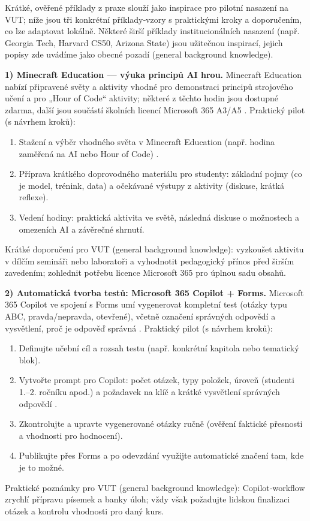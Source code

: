 Krátké, ověřené příklady z praxe slouží jako inspirace pro pilotní nasazení na VUT; níže jsou tři konkrétní příklady‑vzory s praktickými kroky a doporučením, co lze adaptovat lokálně. Některé širší příklady institucionálních nasazení (např. Georgia Tech, Harvard CS50, Arizona State) jsou užitečnou inspirací, jejich popisy zde uvádíme jako obecné pozadí (general background knowledge).

\medskip

\textbf{1) Minecraft Education — výuka principů AI hrou.}  
Minecraft Education nabízí připravené světy a aktivity vhodné pro demonstraci principů strojového učení a pro „Hour of Code“ aktivity; některé z těchto hodin jsou dostupné zdarma, další jsou součástí školních licencí Microsoft 365 A3/A5 \cite{kb_ai_101_tipu_pdf_04e4a115_page_15_2}.  
Praktický pilot (s návrhem kroků):
\begin{enumerate}
  \item Stažení a výběr vhodného světa v Minecraft Education (např. hodina zaměřená na AI nebo Hour of Code) \cite{kb_ai_101_tipu_pdf_04e4a115_page_15_2}.
  \item Příprava krátkého doprovodného materiálu pro studenty: základní pojmy (co je model, trénink, data) a očekávané výstupy z aktivity (diskuse, krátká reflexe).
  \item Vedení hodiny: praktická aktivita ve světě, následná diskuse o možnostech a omezeních AI a závěrečné shrnutí.
\end{enumerate}
Krátké doporučení pro VUT (general background knowledge): vyzkoušet aktivitu v dílčím semináři nebo laboratoři a vyhodnotit pedagogický přínos před širším zavedením; zohlednit potřebu licence Microsoft 365 pro úplnou sadu obsahů.

\medskip

\textbf{2) Automatická tvorba testů: Microsoft 365 Copilot + Forms.}  
Microsoft 365 Copilot ve spojení s Forms umí vygenerovat kompletní test (otázky typu ABC, pravda/nepravda, otevřené), včetně označení správných odpovědí a vysvětlení, proč je odpověď správná \cite{kb_ai_101_tipu_pdf_04e4a115_page_36_1}.  
Praktický pilot (s návrhem kroků):
\begin{enumerate}
  \item Definujte učební cíl a rozsah testu (např. konkrétní kapitola nebo tematický blok).
  \item Vytvořte prompt pro Copilot: počet otázek, typy položek, úroveň (studenti 1.–2. ročníku apod.) a požadavek na klíč a krátké vysvětlení správných odpovědí \cite{kb_ai_101_tipu_pdf_04e4a115_page_36_1}.
  \item Zkontrolujte a upravte vygenerované otázky ručně (ověření faktické přesnosti a vhodnosti pro hodnocení).
  \item Publikujte přes Forms a po odevzdání využijte automatické značení tam, kde je to možné.
\end{enumerate}
Praktické poznámky pro VUT (general background knowledge): Copilot‑workflow zrychlí přípravu písemek a banky úloh; vždy však požadujte lidskou finalizaci otázek a kontrolu vhodnosti pro daný kurs.


